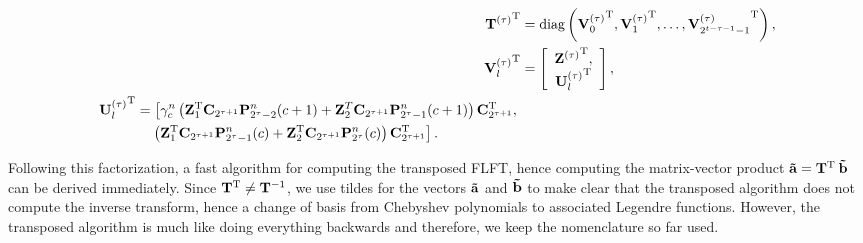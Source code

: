 \begin{align}
  \nonumber
  {\mathbf{T}^{(\tau)}}^{\text{\rm{T}}}   & = \text{diag}\left({\mathbf{V}^{(\tau)}_0}^{\text{\rm{T}}},{\mathbf{V}^{(\tau)}_1}^{\text{\rm{T}}},
  \dots,{\mathbf{V}^{(\tau)}_{2^{t-\tau-1}-1}}^{\text{\rm{T}}}\right),\\
  \nonumber
  {\mathbf{V}^{(\tau)}_l}^{\text{\rm{T}}} & = \left[ \begin{array}{c}
    {\mathbf{Z}^{(\tau)}}^{\text{\rm{T}}},\\ 
  \nonumber
  {\mathbf{U}^{(\tau)}_l}^{\text{\rm{T}}} \end{array} \right],\\
  \label{NFSFT:transposedUformula}
  \begin{split}
    {\mathbf{U}^{(\tau)}_l}^{\text{\rm{T}}} & =
      \left[\gamma_{c}^n \left( \mathbf{Z}_{1}^{\text{\rm{T}}} \mathbf{C}_{2^{\tau+1}} \mathbf{P}_{2^{\tau}-2}^n{\hspace{-0.4ex}}\left(c+1\right) +
      \mathbf{Z}_{2}^T \mathbf{C}_{2^{\tau+1}} \mathbf{P}_{2^{\tau}-1}^n{\hspace{-0.4ex}}\left(c+1\right) \right) \mathbf{C}_{2^{\tau+1}}^{\text{\rm{T}}},\right.\\
     & \quad \left. \left( \mathbf{Z}_{1}^{\text{\rm{T}}} \mathbf{C}_{2^{\tau+1}} \mathbf{P}_{2^{\tau}-1}^n{\hspace{-0.4ex}}\left(c\right) + \mathbf{Z}_{2}^{\text{\rm{T}}} 
     \mathbf{C}_{2^{\tau+1}} \mathbf{P}_{2^{\tau}}^n{\hspace{-0.4ex}}\left(c\right) \right) \mathbf{C}_{2^{\tau+1}}^{\text{\rm{T}}} \right].
  \end{split}
\end{align}

Following this factorization, a fast algorithm for computing the transposed FLFT, hence computing the matrix-vector 
product $\mathbf{\tilde{a}} = \mathbf{T}^{\text{\rm{T}}} \: \mathbf{\tilde{b}}$ can be derived immediately. Since $\mathbf{T}^{\text{\rm{T}}} \neq \mathbf{T}^{-1}$, 
we use tildes for the vectors $\mathbf{\tilde{a}}$ and $\mathbf{\tilde{b}}$ to make clear that the transposed algorithm does not 
compute the inverse transform, hence a change of basis from Chebyshev polynomials to associated Legendre functions. However, 
the transposed algorithm is much like doing everything backwards and therefore, we keep the nomenclature so far used. 

